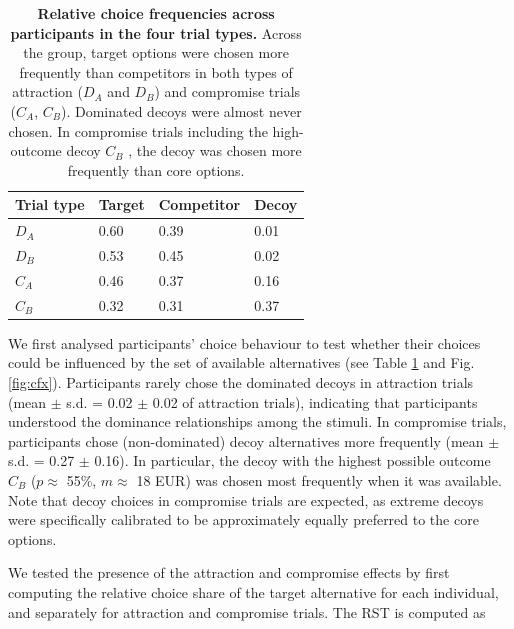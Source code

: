 \documentclass[11pt, a4paper]{article}
\begin{document}
\begin{table}[bt!]
\begin{centering}
\begin{tabular}{@{}llll@{}}
\toprule
\textbf{Trial type} & \textbf{Target} & \textbf{Competitor} & \textbf{Decoy} \\ \midrule
$D_A$               & 0.60            & 0.39                & 0.01           \\
$D_B$               & 0.53            & 0.45                & 0.02           \\
$C_A$               & 0.46            & 0.37                & 0.16           \\
$C_B$               & 0.32            & 0.31                & 0.37           \\ \bottomrule
\end{tabular}
\caption{\textbf{Relative choice frequencies across participants in the four trial types.} Across the group, target options were chosen more frequently than competitors in both types of attraction ($D_A$ and $D_B$) and compromise trials ($C_A$, $C_B$). Dominated decoys were almost never chosen. In compromise trials including the high-outcome decoy $C_B$ , the decoy was chosen more frequently than core options.}
\label{tab:choicefreqs}
\end{centering}
\end{table}

We first analysed participants' choice behaviour to test whether their choices could be influenced by the set of available alternatives (see Table \ref{tab:choicefreqs} and Fig. \ref{fig:cfx}). Participants rarely chose the dominated decoys in attraction trials (mean $\pm$ s.d. = 0.02 $\pm$ 0.02 of attraction trials), indicating that participants understood the dominance relationships among the stimuli. In compromise trials, participants chose (non-dominated) decoy alternatives more frequently (mean $\pm$ s.d. = 0.27 $\pm$ 0.16). In particular, the decoy with the highest possible outcome $C_B$ ($p \approx$ 55\%, $m \approx$ 18 EUR) was chosen most frequently when it was available. Note that decoy choices in compromise trials are expected, as extreme decoys were specifically calibrated to be approximately equally preferred to the core options. 

We tested the presence of the attraction and compromise effects by first computing the relative choice share of the target alternative \parencite[RST;][]{berkowitsch2014RigorouslyTestingMultialternative} for each individual, and separately for attraction and compromise trials. The RST is computed as
\end{document}
